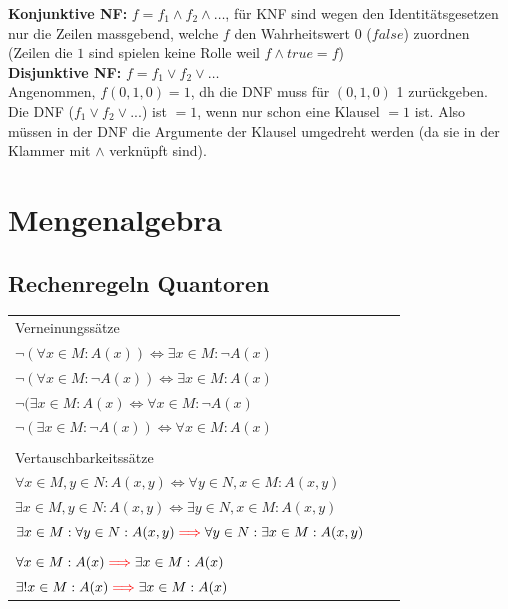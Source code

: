 \documentclass[8pt,landscape]{scrartcl}
\begin{document}
\begin{multicols}{3}
\textbf{Konjunktive NF:} $f = f_1 \land f_2 \land \dots$, f\"ur KNF sind wegen den Identit\"atsgesetzen nur die Zeilen massgebend, welche $f$ den Wahrheitswert 0 ($false$) zuordnen (Zeilen die $1$ sind spielen keine Rolle weil $f \land true = f$)\\

\textbf{Disjunktive NF:} $f = f_1 \lor f_2 \lor \dots$\\
Angenommen, $f(0, 1, 0) = 1$, dh die DNF muss für $(0, 1, 0)$ 1 zurückgeben.
Die DNF ($f_1 \lor f_2 \lor ...$) ist $=1$, wenn nur schon eine Klausel $=1$ ist.
Also m\"ussen in der DNF die Argumente der Klausel umgedreht werden (da sie in der Klammer mit $\land$ verkn\"upft sind).



\section{Mengenalgebra}

\subsection{Rechenregeln Quantoren}
\begin{tabular}{lll}
Verneinungss\"atze     & & \\
$\lnot (\forall x \in M : A(x))       \iff \exists x \in M : \lnot A(x) $ & & \\
$\lnot (\forall x \in M : \lnot A(x)) \iff \exists x \in M : A(x) $ & & \\
$\lnot (\exists x \in M : A(x)        \iff \forall x \in M : \lnot A(x) $ & & \\
$\lnot (\exists x \in M : \lnot A(x)) \iff \forall x \in M : A(x) $ & & \\
& & \\

Vertauschbarkeitss\"atze & & \\
$ \forall x \in M, y \in N : A(x, y) \iff \forall y \in N, x \in M : A(x, y) $ & & \\
$ \exists x \in M, y \in N : A(x, y) \iff \exists y \in N, x \in M: A(x, y) $ & & \\
$ \exists x \in M : \forall y \in N : A(x, y) \textcolor{red}{\implies} \forall y \in N : \exists x \in M : A(x, y) $ & & \\\\
$ \forall x \in M : A(x) \textcolor{red}{\implies} \exists x \in M : A(x)   $ & & \\
$ \exists ! x \in M : A(x) \textcolor{red}{\implies} \exists x \in M : A(x) $ & &\\
\end{tabular}


\end{multicols}
\end{document}
